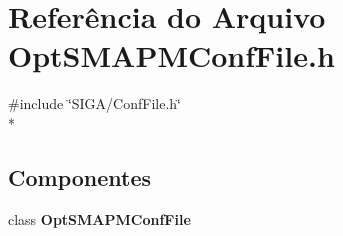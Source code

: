 \section{Referência do Arquivo Opt\+S\+M\+A\+P\+M\+Conf\+File.\+h}
\label{_opt_s_m_a_p_m_conf_file_8h}
{\ttfamily \#include \char`\"{}S\+I\+G\+A/\+Conf\+File.\+h\char`\"{}}\\*
\subsection*{Componentes}
\begin{DoxyCompactItemize}
\item 
class {\bf Opt\+S\+M\+A\+P\+M\+Conf\+File}
\end{DoxyCompactItemize}
